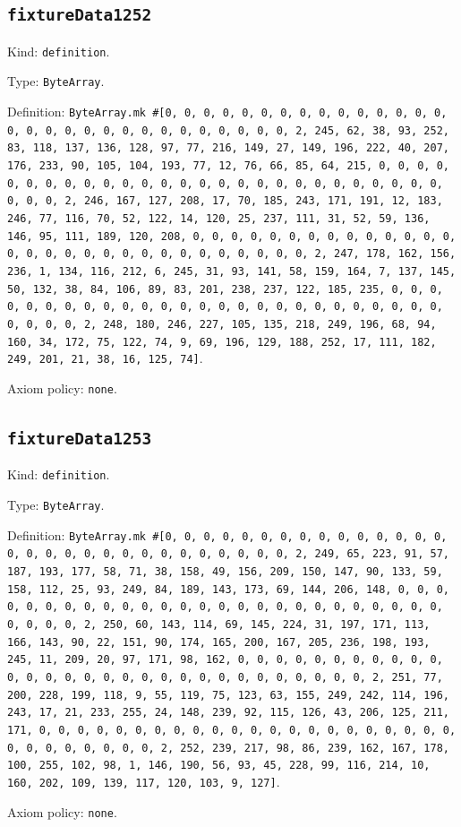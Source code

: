 \documentclass[11pt]{article}
\begin{document}
\subsection*{\texttt{fixtureData1252}}
\noindent Kind: \texttt{definition}.\par
\noindent Type: \texttt{ByteArray}.\par
\noindent Definition: \texttt{ByteArray.mk \#[0, 0, 0, 0, 0, 0, 0, 0, 0, 0, 0, 0, 0, 0, 0, 0, 0, 0, 0, 0, 0, 0, 0, 0, 0, 0, 0, 0, 0, 0, 2, 245, 62, 38, 93, 252, 83, 118, 137, 136, 128, 97, 77, 216, 149, 27, 149, 196, 222, 40, 207, 176, 233, 90, 105, 104, 193, 77, 12, 76, 66, 85, 64, 215, 0, 0, 0, 0, 0, 0, 0, 0, 0, 0, 0, 0, 0, 0, 0, 0, 0, 0, 0, 0, 0, 0, 0, 0, 0, 0, 0, 0, 0, 0, 2, 246, 167, 127, 208, 17, 70, 185, 243, 171, 191, 12, 183, 246, 77, 116, 70, 52, 122, 14, 120, 25, 237, 111, 31, 52, 59, 136, 146, 95, 111, 189, 120, 208, 0, 0, 0, 0, 0, 0, 0, 0, 0, 0, 0, 0, 0, 0, 0, 0, 0, 0, 0, 0, 0, 0, 0, 0, 0, 0, 0, 0, 0, 0, 2, 247, 178, 162, 156, 236, 1, 134, 116, 212, 6, 245, 31, 93, 141, 58, 159, 164, 7, 137, 145, 50, 132, 38, 84, 106, 89, 83, 201, 238, 237, 122, 185, 235, 0, 0, 0, 0, 0, 0, 0, 0, 0, 0, 0, 0, 0, 0, 0, 0, 0, 0, 0, 0, 0, 0, 0, 0, 0, 0, 0, 0, 0, 0, 2, 248, 180, 246, 227, 105, 135, 218, 249, 196, 68, 94, 160, 34, 172, 75, 122, 74, 9, 69, 196, 129, 188, 252, 17, 111, 182, 249, 201, 21, 38, 16, 125, 74]}.\par
\noindent Axiom policy: \texttt{none}.\par
\subsection*{\texttt{fixtureData1253}}
\noindent Kind: \texttt{definition}.\par
\noindent Type: \texttt{ByteArray}.\par
\noindent Definition: \texttt{ByteArray.mk \#[0, 0, 0, 0, 0, 0, 0, 0, 0, 0, 0, 0, 0, 0, 0, 0, 0, 0, 0, 0, 0, 0, 0, 0, 0, 0, 0, 0, 0, 0, 2, 249, 65, 223, 91, 57, 187, 193, 177, 58, 71, 38, 158, 49, 156, 209, 150, 147, 90, 133, 59, 158, 112, 25, 93, 249, 84, 189, 143, 173, 69, 144, 206, 148, 0, 0, 0, 0, 0, 0, 0, 0, 0, 0, 0, 0, 0, 0, 0, 0, 0, 0, 0, 0, 0, 0, 0, 0, 0, 0, 0, 0, 0, 0, 2, 250, 60, 143, 114, 69, 145, 224, 31, 197, 171, 113, 166, 143, 90, 22, 151, 90, 174, 165, 200, 167, 205, 236, 198, 193, 245, 11, 209, 20, 97, 171, 98, 162, 0, 0, 0, 0, 0, 0, 0, 0, 0, 0, 0, 0, 0, 0, 0, 0, 0, 0, 0, 0, 0, 0, 0, 0, 0, 0, 0, 0, 0, 0, 2, 251, 77, 200, 228, 199, 118, 9, 55, 119, 75, 123, 63, 155, 249, 242, 114, 196, 243, 17, 21, 233, 255, 24, 148, 239, 92, 115, 126, 43, 206, 125, 211, 171, 0, 0, 0, 0, 0, 0, 0, 0, 0, 0, 0, 0, 0, 0, 0, 0, 0, 0, 0, 0, 0, 0, 0, 0, 0, 0, 0, 0, 0, 0, 2, 252, 239, 217, 98, 86, 239, 162, 167, 178, 100, 255, 102, 98, 1, 146, 190, 56, 93, 45, 228, 99, 116, 214, 10, 160, 202, 109, 139, 117, 120, 103, 9, 127]}.\par
\noindent Axiom policy: \texttt{none}.\par
\end{document}
